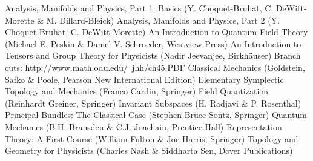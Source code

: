 \documentclass[12pt]{report}
\begin{document}
\begin{thebibliography}{99}
	Analysis, Manifolds and Physics, Part 1: Basics (Y. Choquet-Bruhat, C. DeWitt-Morette \& M. Dillard-Bleick)
	Analysis, Manifolds and Physics, Part 2 (Y. Choquet-Bruhat, C. DeWitt-Morette)
	An Introduction to Quantum Field Theory (Michael E. Peskin \& Daniel V. Schroeder, Westview Press)
    	An Introduction to Tensors and Group Theory for Physicists (Nadir Jeevanjee, Birkh\"auser)
    	Branch cuts: http://www.math.odu.edu/~jhh/ch45.PDF
	Classical Mechanics (Goldstein, Safko \& Poole, Pearson New International Edition)
	Elementary Symplectic Topology and Mechanics (Franco Cardin, Springer)
	Field Quantization (Reinhardt Greiner, Springer)
	Invariant Subspaces (H. Radjavi \& P. Rosenthal)
	Principal Bundles: The Classical Case (Stephen Bruce Sontz, Springer)
    	Quantum Mechanics (B.H. Bransden \& C.J. Joachain, Prentice Hall)
	Representation Theory: A First Course (William Fulton \& Joe Harris, Springer)
	Topology and Geometry for Physicists (Charles Nash \& Siddharta Sen, Dover Publications)
\end{thebibliography}

\printindex
\end{document}
